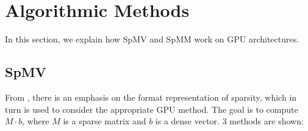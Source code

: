 \documentclass[12pt]{article}
\begin{document}
\section{Algorithmic Methods}
\hspace{0.5cm}In this section, we explain how SpMV and SpMM work on GPU architectures.

\subsection{SpMV}
\hspace{0.5cm}From \cite{spmv_cuda}, there is an emphasis on the format representation of sparsity, which in turn is used to consider the appropriate GPU method. The goal is to compute $M \cdot b$, where $M$ is a sparse matrix and $b$ is a dense vector. 3 methods are shown: 
\end{document}
